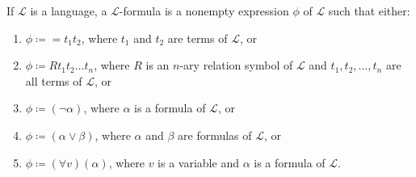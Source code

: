 \documentclass[letterpaper, 10pt]{article}
\begin{document}
	If $\mathcal{L}$ is a language, a $\mathcal{L}$-formula is a nonempty
	expression $\phi$ of $\mathcal{L}$ such that either:
	\begin{enumerate}
		\item $\phi \coloneq =t_{1}t_{2}$, where $t_1$ and $t_2$ are terms of
			$\mathcal{L}$, or
		\item $\phi \coloneq Rt_1t_2\ldots t_{n}$, where $R$ is an $n$-ary
			relation symbol of $\mathcal{L}$ and $t_1, t_2, \ldots, t_n$ are all
			terms of $\mathcal{L}$, or
		\item $\phi \coloneq (\neg\alpha)$, where $\alpha$ is a formula of
			$\mathcal{L}$, or
		\item $\phi \coloneq (\alpha \lor \beta)$, where $\alpha$ and $\beta$
			are formulas of $\mathcal{L}$, or 
		\item $\phi \coloneq (\forall v)(\alpha)$, where $v$ is a variable and
			$\alpha$ is a formula of $\mathcal{L}$.
	\end{enumerate}
\end{document}
